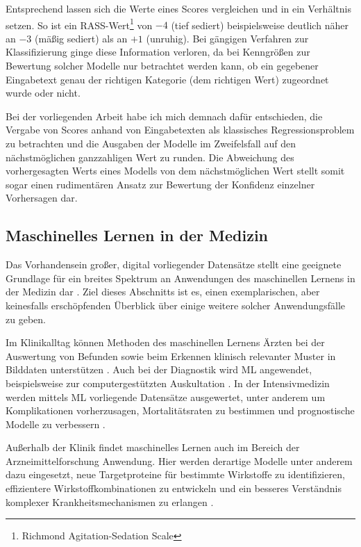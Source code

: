Entsprechend lassen sich die Werte eines Scores vergleichen und in ein Verhältnis setzen. So ist ein RASS-Wert\footnote{Richmond Agitation-Sedation Scale} von $-4$ (tief sediert) beispielsweise deutlich näher an $-3$ (mäßig sediert) als an $+1$ (unruhig). Bei gängigen Verfahren zur Klassifizierung ginge diese Information verloren, da bei Kenngrößen zur Bewertung solcher Modelle nur betrachtet werden kann, ob ein gegebener Eingabetext genau der richtigen Kategorie (dem richtigen Wert) zugeordnet wurde oder nicht. 

Bei der vorliegenden Arbeit habe ich mich demnach dafür entschieden, die Vergabe von Scores anhand von Eingabetexten als klassisches Regressionsproblem zu betrachten und die Ausgaben der Modelle im Zweifelsfall auf den nächstmöglichen ganzzahligen Wert zu runden. Die Abweichung des vorhergesagten Werts eines Modells von dem nächstmöglichen Wert stellt somit sogar einen rudimentären Ansatz zur Bewertung der Konfidenz einzelner Vorhersagen dar. %

\subsection{Maschinelles Lernen in der Medizin}
Das Vorhandensein großer, digital vorliegender Datensätze stellt eine geeignete Grundlage für ein breites Spektrum an Anwendungen des maschinellen Lernens in der Medizin dar \citep{chenHowDevelopMachine2019}. Ziel dieses Abschnitts ist es, einen exemplarischen, aber keinesfalls erschöpfenden Überblick über einige weitere solcher Anwendungsfälle zu geben.

Im Klinikalltag können Methoden des maschinellen Lernens Ärzten bei der Auswertung von Befunden sowie beim Erkennen klinisch relevanter Muster in Bilddaten unterstützen \citep{shahArtificialIntelligenceMachine2019}. Auch bei der Diagnostik wird ML angewendet, beispielsweise zur computergestützten Auskultation \citep{reedHeartSoundAnalysis2004}. In der Intensivmedizin werden mittels ML vorliegende Datensätze ausgewertet, unter anderem um Komplikationen vorherzusagen, Mortalitätsraten zu bestimmen und prognostische Modelle zu verbessern \citep{shillanUseMachineLearning2019, krishnanSupervisedLearningApproach2018}.

Außerhalb der Klinik findet maschinelles Lernen auch im Bereich der Arzneimittelforschung Anwendung. Hier werden derartige Modelle unter anderem dazu eingesetzt, neue Targetproteine für bestimmte Wirkstoffe zu identifizieren, effizientere Wirkstoffkombinationen zu entwickeln und ein besseres Verständnis komplexer Krankheitsmechanismen zu erlangen \citep{vamathevanApplicationsMachineLearning2019}.

